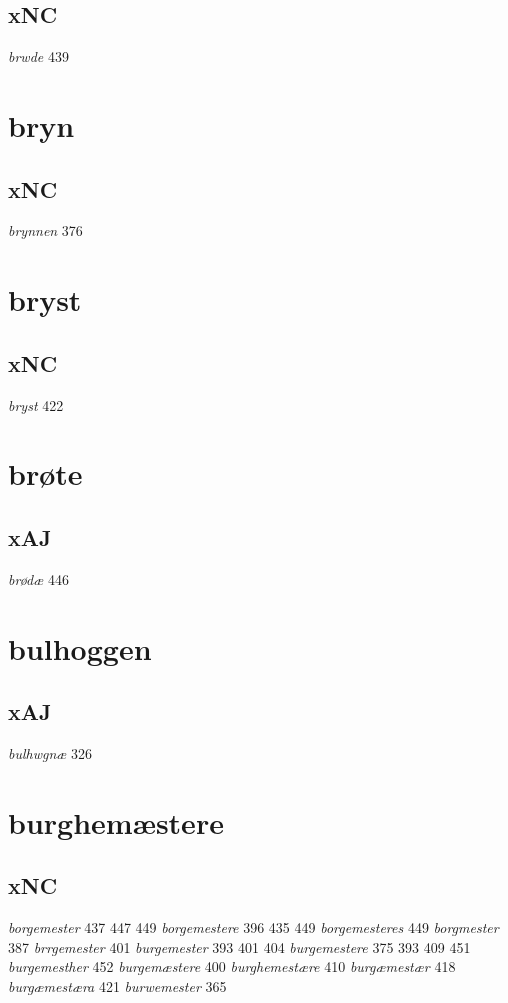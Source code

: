 \documentclass[a4paper,twocolumn]{article}
\begin{document}
\subsection{xNC}
\label{sec:orgc0a40e0}
\emph{brwde} 439 
\section{bryn}
\label{sec:org19a74ca}
\subsection{xNC}
\label{sec:org2185906}
\emph{brynnen} 376 
\section{bryst}
\label{sec:org7ceaa07}
\subsection{xNC}
\label{sec:orge6e562f}
\emph{bryst} 422 
\section{brøte}
\label{sec:orgacd62d1}
\subsection{xAJ}
\label{sec:org54495f4}
\emph{brødæ} 446 
\section{bulhoggen}
\label{sec:org41aee56}
\subsection{xAJ}
\label{sec:org001721a}
\emph{bulhwgnæ} 326 
\section{burghemæstere}
\label{sec:org7bafdc4}
\subsection{xNC}
\label{sec:org953eba8}
\emph{borgemester} 437 447 449 \emph{borgemestere} 396 435 449 \emph{borgemesteres} 449 \emph{borgmester} 387 \emph{brrgemester} 401 \emph{burgemester} 393 401 404 \emph{burgemestere} 375 393 409 451 \emph{burgemesther} 452 \emph{burgemæstere} 400 \emph{burghemestære} 410 \emph{burgæmestær} 418 \emph{burgæmestæra} 421 \emph{burwemester} 365 
\end{document}
